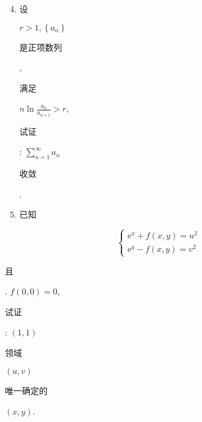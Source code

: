 \documentclass[10pt]{article}
\begin{document}
\begin{enumerate}
  \setcounter{enumi}{3}
  \item \begin{CJK}{UTF8}{mj}设\end{CJK} $r>1,\left\{a_{n}\right\}$ \begin{CJK}{UTF8}{mj}是正项数列\end{CJK}, \begin{CJK}{UTF8}{mj}满足\end{CJK} $n \ln \frac{a_{n}}{a_{n+1}}>r$, \begin{CJK}{UTF8}{mj}试证\end{CJK}: $\sum_{n=1}^{\infty} a_{n}$ \begin{CJK}{UTF8}{mj}收敛\end{CJK}.

  \item \begin{CJK}{UTF8}{mj}已知\end{CJK}

\end{enumerate}
$$
\left\{\begin{array}{l}
\mathrm{e}^{x}+f(x, y)=u^{2} \\
\mathrm{e}^{y}-f(x, y)=v^{2}
\end{array}\right.
$$
\begin{CJK}{UTF8}{mj}且\end{CJK}. $f(0,0)=0$, \begin{CJK}{UTF8}{mj}试证\end{CJK}: $(1,1)$ \begin{CJK}{UTF8}{mj}领域\end{CJK} $(u, v)$ \begin{CJK}{UTF8}{mj}唯一确定的\end{CJK} $(x, y)$.
\end{document}
